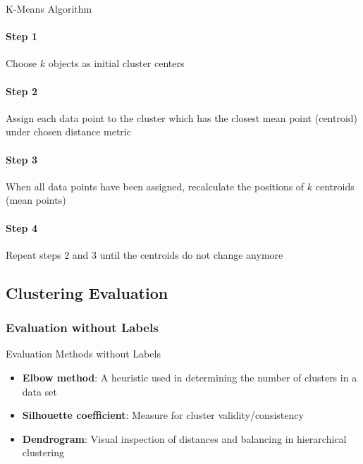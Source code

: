 \begin{KR}{K-Means Algorithm}\\
\paragraph{Step 1}
Choose $k$ objects as initial cluster centers

\paragraph{Step 2}
Assign each data point to the cluster which has the closest mean point (centroid) under chosen distance metric

\paragraph{Step 3}
When all data points have been assigned, recalculate the positions of $k$ centroids (mean points)

\paragraph{Step 4}
Repeat steps 2 and 3 until the centroids do not change anymore
\end{KR}


\subsection{Clustering Evaluation}

\subsubsection{Evaluation without Labels}

\begin{concept}{Evaluation Methods without Labels}
\begin{itemize}
    \item \textbf{Elbow method}: A heuristic used in determining the number of clusters in a data set
    \item \textbf{Silhouette coefficient}: Measure for cluster validity/consistency
    \item \textbf{Dendrogram}: Visual inspection of distances and balancing in hierarchical clustering
\end{itemize}
\end{concept}

